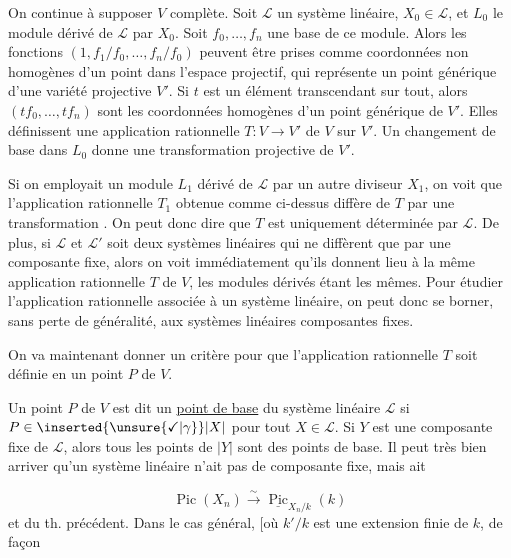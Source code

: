 On continue à supposer $V$ complète. Soit $\mathcal L$ un système linéaire, $X_0\in\mathcal L$, et $L_0$ le module dérivé de $\mathcal L$ par $X_0$. Soit $f_0,\ldots,f_n$ une base de ce module. Alors les fonctions $(1,f_1/f_0,\ldots,f_n/f_0)$ peuvent être prises comme coordonnées non homogènes d'un point dans l'espace projectif, qui représente un point générique d'une variété projective $V'$. Si $t$ est un élément transcendant sur tout, alors $(tf_0,\ldots,tf_n)$ sont les coordonnées homogènes d'un point générique de $V'$. Elles définissent une application rationnelle $T:V\longrightarrow V'$ de $V$ sur $V'$. Un changement de base dans $L_0$ donne une transformation projective de $V'$.

Si on employait un module $L_1$ dérivé de $\mathcal L$ par un autre diviseur $X_1$, on voit que l'application rationnelle $T_1$ obtenue comme ci-dessus diffère de $T$ par une transformation . On peut donc dire que $T$ est uniquement déterminée par $\mathcal L$. De plus, si $\mathcal L$ et $\mathcal L'$ soit deux systèmes linéaires qui ne diffèrent que par une composante fixe, alors on voit immédiatement qu'ils donnent lieu à la même application rationnelle $T$ de $V$, les modules dérivés étant les mêmes. Pour étudier l'application rationnelle associée à un système linéaire, on peut donc se borner, sans perte de généralité, aux systèmes linéaires  composantes fixes.


On va maintenant donner un critère pour que l'application rationnelle $T$ soit définie en un point $P$ de $V$.

Un point $P$ de $V$ est dit un \uline{point de base} du système linéaire $\mathcal L$ si $P\in\inserted{\unsure{\checkmark|\gamma}}|X|$ pour tout $X\in\mathcal L$. Si $Y$ est une composante fixe de $\mathcal L$, alors tous les points de $|Y|$ sont des points de base. Il peut très bien arriver qu'un système linéaire n'ait pas de composante fixe, mais ait



\[
\operatorname{Pic}(X_n)\xrightarrow{\sim}\underline{\operatorname{Pic}}_{X_n/k}(k)
\]
et du th. précédent. Dans le cas général,    [où $k'/k$ est une extension finie de $k$,  de façon

